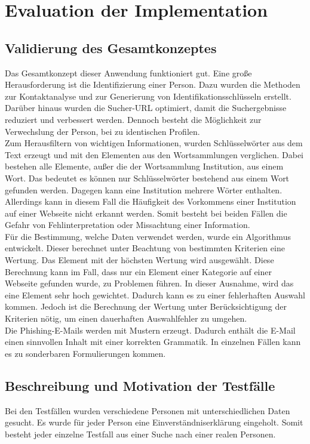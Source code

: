 

\chapter{Evaluation der Implementation}  %
\label{cha:Evaluation der Implementation} %
\section{Validierung des Gesamtkonzeptes}
Das Gesamtkonzept dieser Anwendung funktioniert gut. Eine große Herausforderung ist die Identifizierung einer Person. Dazu wurden die Methoden zur Kontaktanalyse und zur Generierung von Identifikationsschlüsseln erstellt. Darüber hinaus wurden die Sucher-URL optimiert, damit die Suchergebnisse reduziert und verbessert werden. Dennoch besteht die Möglichkeit zur Verwechslung der Person, bei zu identischen Profilen.\\
Zum Herausfiltern von wichtigen Informationen, wurden Schlüsselwörter aus dem Text erzeugt und mit den Elementen aus den Wortsammlungen verglichen. Dabei bestehen alle Elemente, außer die der Wortsammlung Institution, aus einem Wort. Das bedeutet es können nur Schlüsselwörter bestehend aus einem Wort gefunden werden. Dagegen kann eine Institution mehrere Wörter enthalten. Allerdings kann in diesem Fall die Häufigkeit des Vorkommens einer Institution auf einer Webseite nicht erkannt werden. Somit besteht bei beiden Fällen die Gefahr von Fehlinterpretation oder Missachtung einer Information.\\
Für die Bestimmung, welche Daten verwendet werden, wurde ein Algorithmus entwickelt. Dieser berechnet unter Beachtung von bestimmten Kriterien eine Wertung. Das Element mit der höchsten Wertung wird ausgewählt. Diese Berechnung kann im Fall, dass nur ein Element einer Kategorie auf einer Webseite gefunden wurde, zu Problemen führen. In dieser Ausnahme, wird das eine Element sehr hoch gewichtet. Dadurch kann es zu einer fehlerhaften Auswahl kommen. Jedoch ist die Berechnung der Wertung unter Berücksichtigung der Kriterien nötig, um einen dauerhaften Auswahlfehler zu umgehen.\\
Die Phishing-E-Mails werden mit Mustern erzeugt. Dadurch enthält die E-Mail einen sinnvollen Inhalt mit einer korrekten Grammatik. In einzelnen Fällen kann es zu sonderbaren Formulierungen kommen.

\section{Beschreibung und Motivation der Testfälle}
Bei den Testfällen wurden verschiedene Personen mit unterschiedlichen Daten gesucht. Es wurde für jeder Person eine Einverständniserklärung eingeholt. Somit besteht jeder einzelne Testfall aus einer Suche nach einer realen Personen.
